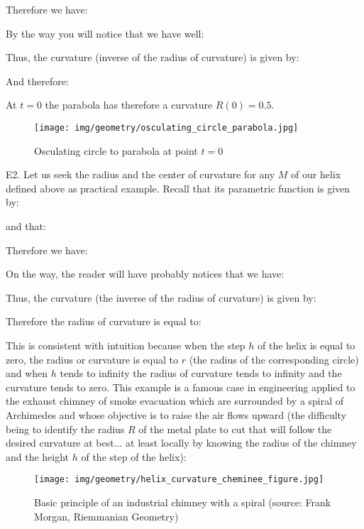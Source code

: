 {	\begin{tcolorbox}[colframe=black,colback=white,sharp corners]
	Therefore we have:
	
	By the way you will notice that we have well:
	
	Thus, the curvature (inverse of the radius of curvature) is given by:
	
	And therefore:
	
	At $t=0$ the parabola has therefore a curvature $R(0)=0.5$.
	\begin{figure}[H]
		\centering
		\texttt{[image: img/geometry/osculating\_circle\_parabola.jpg]}
		\caption[]{Osculating circle to parabola at point $t=0$}
	\end{figure}
	
	E2. Let us seek the radius and the center of curvature for any $M$ of our helix defined above as practical example. Recall that its parametric function is given by:
	
	and that:
	
	\end{tcolorbox}
	
	\pagebreak
	\begin{tcolorbox}[colframe=black,colback=white,sharp corners]
	
	Therefore we have:
	
	On the way, the reader will have probably notices that we have:
	
	Thus, the curvature (the inverse of the radius of curvature) is given by:
	
	Therefore the radius of curvature is equal to:
	
	This is consistent with intuition because when the step $h$ of the helix is equal to zero, the radius or curvature is equal to $r$ (the radius of the corresponding circle) and when $h$ tends to infinity the radius of curvature tends to infinity and the curvature tends to zero. This example is a famous case in engineering applied to the exhaust chimney of smoke evacuation which are surrounded by a spiral of Archimedes and whose objective is to raise the air flows upward (the difficulty being to identify the radius $R$ of the metal plate to cut that will follow the desired curvature at best... at least locally by knowing the radius of the chimney and the height $h$ of the step of the helix):
	\begin{figure}[H]
		\centering
		\texttt{[image: img/geometry/helix\_curvature\_cheminee\_figure.jpg]}
		\caption[]{Basic principle of an industrial chimney with a spiral (source: Frank Morgan, Riemmanian Geometry)}
	\end{figure}
	\end{tcolorbox}
	
}
